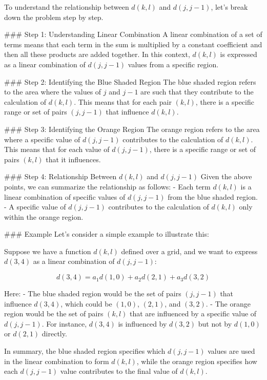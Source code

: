 To understand the relationship between \(d(k, l)\) and \(d(j, j-1)\), let's break down the problem step by step.

### Step 1: Understanding Linear Combination
A linear combination of a set of terms means that each term in the sum is multiplied by a constant coefficient and then all these products are added together. In this context, \(d(k, l)\) is expressed as a linear combination of \(d(j, j-1)\) values from a specific region.

### Step 2: Identifying the Blue Shaded Region
The blue shaded region refers to the area where the values of \(j\) and \(j-1\) are such that they contribute to the calculation of \(d(k, l)\). This means that for each pair \((k, l)\), there is a specific range or set of pairs \((j, j-1)\) that influence \(d(k, l)\).

### Step 3: Identifying the Orange Region
The orange region refers to the area where a specific value of \(d(j, j-1)\) contributes to the calculation of \(d(k, l)\). This means that for each value of \(d(j, j-1)\), there is a specific range or set of pairs \((k, l)\) that it influences.

### Step 4: Relationship Between \(d(k, l)\) and \(d(j, j-1)\)
Given the above points, we can summarize the relationship as follows:
- Each term \(d(k, l)\) is a linear combination of specific values of \(d(j, j-1)\) from the blue shaded region.
- A specific value of \(d(j, j-1)\) contributes to the calculation of \(d(k, l)\) only within the orange region.

### Example
Let's consider a simple example to illustrate this:

Suppose we have a function \(d(k, l)\) defined over a grid, and we want to express \(d(3, 4)\) as a linear combination of \(d(j, j-1)\):

\[ d(3, 4) = a_1 d(1, 0) + a_2 d(2, 1) + a_3 d(3, 2) \]

Here:
- The blue shaded region would be the set of pairs \((j, j-1)\) that influence \(d(3, 4)\), which could be \((1, 0)\), \((2, 1)\), and \((3, 2)\).
- The orange region would be the set of pairs \((k, l)\) that are influenced by a specific value of \(d(j, j-1)\). For instance, \(d(3, 4)\) is influenced by \(d(3, 2)\) but not by \(d(1, 0)\) or \(d(2, 1)\) directly.

In summary, the blue shaded region specifies which \(d(j, j-1)\) values are used in the linear combination to form \(d(k, l)\), while the orange region specifies how each \(d(j, j-1)\) value contributes to the final value of \(d(k, l)\).